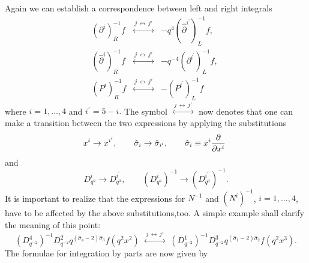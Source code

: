 \documentclass[a4paper,11pt,oneside]{article}
\newcommand{\underleftrightarrowf}{\stackrel{\;j\,\longleftrightarrow\,j'\;}{\longleftrightarrow}}
\begin{document}
Again we can establish a correspondence between left and right integrals 
\begin{eqnarray}
\left( \partial ^{i}\right) _{R}^{-1}f&\underleftrightarrowf&-q^{4}\left( \hat{\partial}%
^{i^{\prime }}\right) _{L}^{-1}f, \\
\left( \hat{\partial}^{i}\right) _{R}^{-1}f&\underleftrightarrowf&-q^{-4}\left( \partial ^{i^{\prime
}}\right) _{L}^{-1}f,  \nonumber \\
\left( P^{i}\right) _{R}^{-1}f&\underleftrightarrowf&-\left( P^{i^{\prime }}\right) _{L}^{-1}f\qquad
\nonumber
\end{eqnarray}
where $i=1,\ldots ,4$ and $i^{\prime }=5-i.$ The symbol $\underleftrightarrowf$ now denotes
that one can make a transition between the two expressions by applying the
substitutions 
\begin{equation}
x^{i}\rightarrow x^{i^{\prime }},\qquad \hat{\sigma}_{i}\rightarrow \hat{%
\sigma}_{i^{\prime }},\qquad \hat{\sigma}_{i}\equiv x^{i}\frac{\partial }{%
\partial x^{i}}\ 
\end{equation}
and 
\begin{equation}
D_{q^{a}}^{i}\rightarrow D_{q^{a}}^{i^{\prime }},\qquad \left(
D_{q^{a}}^{i}\right) ^{-1}\rightarrow \left( D_{q^{a}}^{i^{\prime }}\right)
^{-1}.
\end{equation}
It is important to realize that the expressions for $N^{-1}$ and $\left(
N^{i}\right) ^{-1}$, $i=1,\ldots ,4$, have to be affected by the above
substitutions,too. A simple example shall clarify the meaning of this point: 
\begin{equation}
\left( D_{q^{-2}}^{4}\right) ^{-1}D_{q^{-2}}^{2}q^{\left( \hat{\sigma}%
_{4}-2\right) \hat{\sigma}_{3}}f\left( q^{2}x^{2}\right) \;\underleftrightarrowf\;\left(
D_{q^{-2}}^{1}\right) ^{-1}D_{q^{-2}}^{3}q^{\left( \hat{\sigma}_{1}-2\right) 
\hat{\sigma}_{2}}f\left( q^{2}x^{3}\right) .
\end{equation}
The formulae for integration by parts are now given by 
\end{document}
